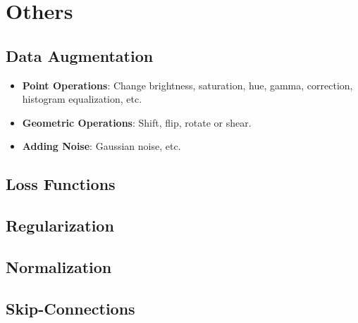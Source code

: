 \documentclass[a4paper]{article}
\begin{document}
\section{Others}

\subsection{Data Augmentation}

\begin{itemize}
	\item \textbf{Point Operations}: Change brightness, saturation, hue, gamma, correction, histogram equalization, etc.
	\item \textbf{Geometric Operations}: Shift, flip, rotate or shear.
	\item \textbf{Adding Noise}: Gaussian noise, etc.
\end{itemize}

\subsection{Loss Functions}

\subsection{Regularization}

\subsection{Normalization}

\subsection{Skip-Connections}



%
%
\end{document}
